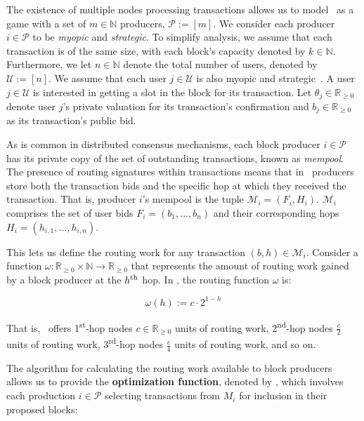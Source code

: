The existence of multiple nodes processing transactions allows us to model \ourTFM\ as a game with a set of $m\in\mathbb{N}$ producers, $\mathcal{P}:=[m]$. We consider each producer $i\in \mathcal{P}$ to be \emph{myopic} and \emph{strategic}. To simplify analysis, we assume that each transaction is of the same size, with each block's capacity denoted by $k \in \mathbb{N}$. Furthermore, we let $n\in\mathbb{N}$ denote the total number of users, denoted by $\mathcal{U}:=[n]$. We assume that each user $j\in\mathcal{U}$ is also myopic and strategic~\cite{roughgarden2021,ferreira2021dynamic,chung2023foundations,gafni2024barriers,damle2024designing}. A user $j\in\mathcal{U}$ is interested in getting a slot in the block for its transaction. Let $\theta_{j}\in \mathbb{R}_{\geq 0}$ denote user $j$'s private valuation for its transaction's confirmation and $b_j \in \mathbb{R}_{\geq 0}$ as its transaction's public bid.

As is common in distributed consensus mechanisms, each block producer $i\in \mathcal{P}$ has its private copy of the set of outstanding transactions, known as \emph{mempool}. The presence of routing signatures within transactions means that in \ourTFM\ producers store both the transaction bids and the specific hop at which they received the transaction. That is, producer $i$'s mempool is the tuple $\mathcal{M}_i=({F}_i, {H}_i)$. $\mathcal{M}_i$ comprises the set of user bids $F_i = (b_1,\ldots, b_{n})$ and their corresponding hops $H_i = (h_{i,1},\ldots, h_{i,n})$.

This lets us define the routing work for any transaction $(b,h) \in \mathcal{M}_i$. Consider a function $\omega:\mathbb{R}_{\geq 0}\times\mathbb{N}\rightarrow\mathbb{R}_{\geq 0}$ that represents the amount of routing work gained by a block producer at the $h\textsuperscript{th}$ hop. In \ourTFM, the routing function $\omega$ is:

\begin{equation}
    \omega(h) := c\cdot2^{1 - h}
\end{equation}

That is, \ourTFM\ offers 1\textsuperscript{st}-hop nodes $c\in \mathbb{R}_{\geq 0}$ units of routing work, 2\textsuperscript{nd}-hop nodes $\frac{c}{2}$ units of routing work, 3\textsuperscript{rd}-hop nodes $\frac{c}{4}$ units of routing work, and so on.

The algorithm for calculating the routing work available to block producers allows us to provide the \textbf{optimization function}, denoted by \ourOPT, which involves each production $i\in \mathcal{P}$ selecting transactions from $M_i$ for inclusion in their proposed blocks:

